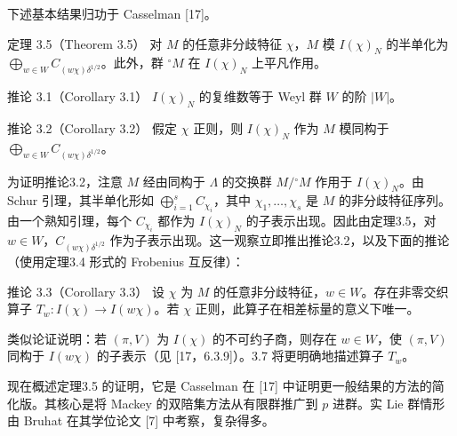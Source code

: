 下述基本结果归功于 Casselman [17]。
\begin{originaltheorem}{定理 3.5（Theorem 3.5）}
对 $M$ 的任意非分歧特征 $\chi$，$M$ 模 $I(\chi)_N$ 的半单化为 $\bigoplus_{w\in W}C_{(w\chi)\delta^{1/2}}$。此外，群 $^\circ M$ 在 $I(\chi)_N$ 上平凡作用。
\end{originaltheorem}
\begin{originaltheorem}{推论 3.1（Corollary 3.1）}
$I(\chi)_N$ 的复维数等于 Weyl 群 $W$ 的阶 $|W|$。
\end{originaltheorem}
\begin{originaltheorem}{推论 3.2（Corollary 3.2）}
假定 $\chi$ 正则，则 $I(\chi)_N$ 作为 $M$ 模同构于 $\bigoplus_{w\in W}C_{(w\chi)\delta^{1/2}}$。
\end{originaltheorem}
为证明推论3.2，注意 $M$ 经由同构于 $\Lambda$ 的交换群 $M/{}^\circ M$ 作用于 $I(\chi)_N$。由 Schur 引理，其半单化形如 $\bigoplus_{i=1}^sC_{\chi_i}$，其中 $\chi_1,\ldots,\chi_s$ 是 $M$ 的非分歧特征序列。由一个熟知引理，每个 $C_{\chi_i}$ 都作为 $I(\chi)_N$ 的子表示出现。因此由定理3.5，对 $w\in W$，$C_{(w\chi)\delta^{1/2}}$ 作为子表示出现。这一观察立即推出推论3.2，以及下面的推论（使用定理3.4 形式的 Frobenius 互反律）：
\begin{originaltheorem}{推论 3.3（Corollary 3.3）}
设 $\chi$ 为 $M$ 的任意非分歧特征，$w\in W$。存在非零交织算子 $T_w:I(\chi)\to I(w\chi)$。若 $\chi$ 正则，此算子在相差标量的意义下唯一。
\end{originaltheorem}
类似论证说明：若 $(\pi,V)$ 为 $I(\chi)$ 的不可约子商，则存在 $w\in W$，使 $(\pi,V)$ 同构于 $I(w\chi)$ 的子表示（见 [17，6.3.9]）。3.7 将更明确地描述算子 $T_w$。

现在概述定理3.5 的证明，它是 Casselman 在 [17] 中证明更一般结果的方法的简化版。其核心是将 Mackey 的双陪集方法从有限群推广到 $p$ 进群。实 Lie 群情形由 Bruhat 在其学位论文 [7] 中考察，复杂得多。

